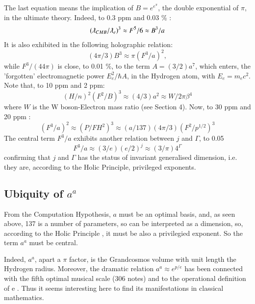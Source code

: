 \documentclass[twoside,draft]{article}
\begin{document}
\begin{sloppypar}
{The last equation means the implication of $B = e^{e^{\pi}}$, the double exponential of $\pi$, in the ultimate theory. Indeed, to 0.3 ppm and 0.03 \% :
\begin{equation}
(\lambdabar_{CMB}/\lambdabar_e)^3 \approx F^5/6 \approx B^3/a
\end{equation}
It is also exhibited in the following holographic relation:
\begin{equation}
(4\pi/3) B^3 \approx \pi(F^3/a)^2,
\end{equation}
while $F^3/(44\pi)$ is close, to 0.01 \%, to the term $A = (3/2) a^7$, which enters, the 'forgotten' electromagnetic power $E_e^2/\hbar A$, in the Hydrogen atom, with $E_e = m_ec^2$.
Note that, to 10 ppm and 2 ppm:
\begin{equation}
(H/n)^2(F^2/B)^3 \approx (4/3) a^2 \approx W/2\pi \beta^4
\end{equation}
where $W$ is the W boson-Electron mass ratio (see Section 4). Now, to 30 ppm and 20 ppm :  
\begin{equation}
 (F^3/a)^2 \approx (P/FH^2)^3  \approx  (a/137)(4\pi/3)(F^2/p^{1/2})^3 
\end{equation}
The central term $F^3/a$ exhibits another relation between $j$ and $\Gamma$, to 0.05 %
\begin{equation}
F^3/a \approx (3/e)(e/2)^j  \approx (3/\pi) 4^{\Gamma}
\end{equation}
confirming that $j$ and $\Gamma$ has the status of invariant generalised dimension, i.e. they are, according to the Holic Principle, privileged exponents.

\subsection{Ubiquity of $a^{a}$}

From the Computation Hypothesis, $a$ must be an optimal basis, and, as seen above, 137 is a number of parameters, so can be interpreted as a dimension, so, according to the Holic Principle , it must be also a privilegied exponent. So the term $a^a$ must be central.
    
Indeed, $a^a$, apart a $\pi$ factor, is the Grandcosmos volume with unit length the Hydrogen radius. Moreover, the dramatic relation $a^a\approx e^{p/e}$ has been connected with the fifth optimal musical scale (306 notes) and to the operational definition of e \cite{Sanchez1}. Thus it seems interesting here to find its manifestations in classical mathematics. 

}
\end{sloppypar}
\end{document}
